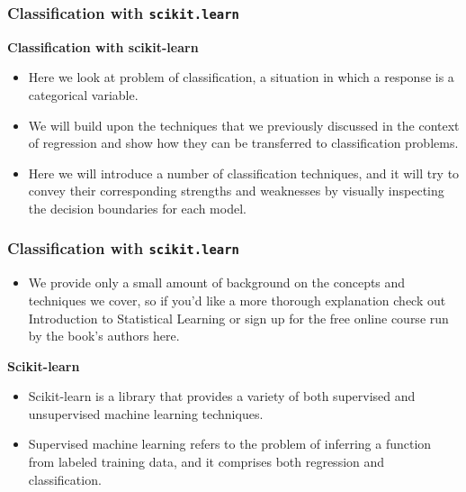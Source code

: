 \documentclass[MASTER.tex]{subfiles}
\begin{document}
 
\begin{frame}
		\frametitle{Classification with \texttt{scikit.learn}}
		\Large
\noindent \textbf{Classification with scikit-learn}
\begin{itemize}
\item Here we look at problem of classification, a situation in which a response is a categorical variable. 
\item We will build upon the techniques that we previously discussed in the context of regression and show how they can be transferred to classification problems. 
\item Here we will introduce a number of classification techniques, and it will try to convey their corresponding strengths and weaknesses by visually inspecting the decision boundaries for each model.
\end{itemize}

\end{frame}
\begin{frame}
	\frametitle{Classification with \texttt{scikit.learn}}
	\Large
	\begin{itemize}
	\item We provide only a small amount of background on the concepts and techniques we cover, so if you’d like a more thorough explanation check out Introduction to Statistical Learning or sign up for the free online course run by the book’s authors here.
	\end{itemize}

\end{frame}
\begin{frame}
	\Large
\noindent	\textbf{Scikit-learn}\\
	\begin{itemize}
	\item Scikit-learn is a library that provides a variety of both supervised and unsupervised machine learning techniques. 
	\item Supervised machine learning refers to the problem of inferring a function from labeled training data, and it comprises both regression and classification. 
	\end{itemize}


\end{frame}
\end{document}
